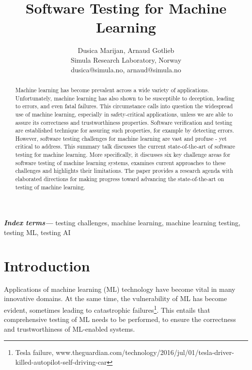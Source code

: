\documentclass[letterpaper]{article} %
\title{Software Testing for Machine Learning}
\author{Dusica Marijan, Arnaud Gotlieb\\ %
Simula Research Laboratory, Norway\\ %
dusica@simula.no, arnaud@simula.no %
}
\providecommand{\keywords}[1]{\textbf{\textit{Index terms---}} #1}
\begin{document}
\maketitle

\begin{abstract}
Machine learning has become prevalent across a wide variety of applications. Unfortunately, machine learning has also shown to be susceptible to deception, leading to errors, and even fatal failures. This circumstance calls into question the widespread use of machine learning, especially in safety-critical applications, unless we are able to assure its correctness and trustworthiness properties. Software verification and testing are established technique for assuring such properties, for example by detecting errors. However, software testing challenges for machine learning are vast and profuse - yet critical to address. This summary talk discusses the current state-of-the-art of software testing for machine learning. More specifically, it discusses six key challenge areas for software testing of machine learning systems, examines current approaches to these challenges and highlights their limitations. The paper provides a research agenda with elaborated directions for making progress toward advancing the state-of-the-art on testing of machine learning.
\end{abstract}

\keywords{testing challenges, machine learning, machine
learning testing, testing ML, testing AI}

\section{Introduction}
Applications of machine learning (ML) technology have become vital in many innovative domains. At the same time, the vulnerability of ML has become evident, sometimes leading to catastrophic failures\footnote{Tesla failure, www.theguardian.com/technology/2016/jul/01/tesla-driver-killed-autopilot-self-driving-car}. This entails that comprehensive testing of ML needs to be performed, to ensure the correctness and trustworthiness of ML-enabled systems. 
\end{document}
